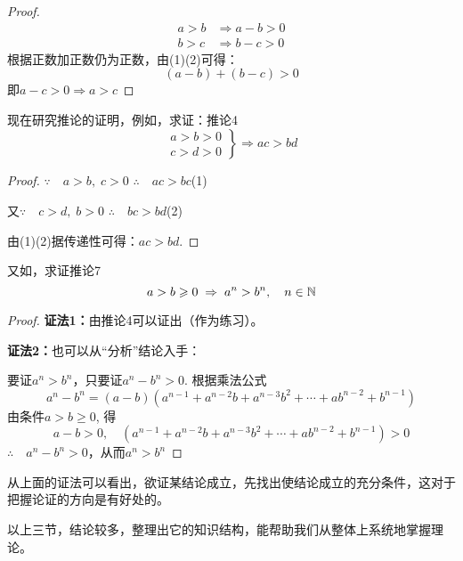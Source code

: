 \begin{proof}
\begin{align}
    a>b&\Longrightarrow a-b>0 \tag{1}\\
    b>c&\Longrightarrow b-c>0 \tag{2}
\end{align}
根据正数加正数仍为正数，由(1)(2)可得：
$$(a-b)+(b-c)>0$$即$a-c>0\Longrightarrow a>c$
\end{proof}

现在研究推论的证明，例如，求证：推论4 
\[\left.\begin{array}{c}
    a>b>0\\
    c>d>0
\end{array}\right\} \Longrightarrow ac>bd\] 
\begin{proof}
$\because\quad a>b,\; c>0$ \qquad $\therefore\quad ac>bc$\hfill(1)

又$\because\quad c>d,\; b>0$ \qquad $\therefore\quad bc>bd$\hfill(2)

由(1)(2)据传递性可得：$ac>bd$.
\end{proof}

又如，求证推论7
\[a>b\geqslant 0\;\Rightarrow\; a^n>b^n,\quad n\in\mathbb{N}\]
\begin{proof}
\textbf{证法1：}由推论4可以证出（作为练习）。

\textbf{证法2：}也可以从“分析”结论入手：

要证$a^n>b^n$，只要证$a^n-b^n>0$. 根据乘法公式
\[a^n-b^n=(a-b)(a^{n-1}+a^{n-2}b +a^{n-3}b^2+\cdots+ab^{n-2} +b^{n-1})\]
由条件$a>b\ge 0$, 得
\[a-b>0,\quad (a^{n-1}+a^{n-2}b +a^{n-3}b^2+\cdots+ab^{n-2} +b^{n-1})>0\] 
$\therefore\quad a^n-b^n>0$，从而$a^n>b^n$
\end{proof}

\begin{rmk}
从上面的证法可以看出，欲证某结论成立，先找出使结论成立的充分条件，这对于把握论证的方向是有好处的。
\end{rmk}

 以上三节，结论较多，整理出它的知识结构，能帮助我们从整体上系统地掌握理论。   

\begin{center}
\end{center}

